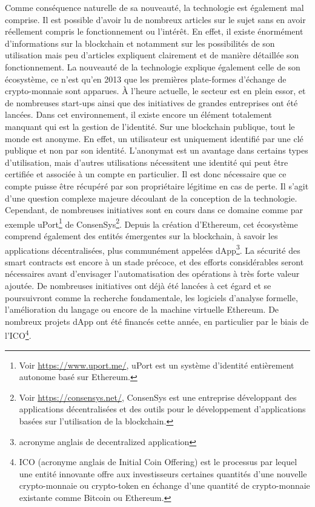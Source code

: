 \documentclass{tnreport}
\begin{document}
Comme conséquence naturelle de sa nouveauté, la technologie est également mal comprise.
Il est possible d'avoir lu de nombreux articles sur le sujet sans en avoir réellement compris le fonctionnement ou l'intérêt.
En effet, il existe énormément d'informations sur la blockchain et notamment sur les possibilités de son utilisation mais peu d'articles expliquent clairement et de manière détaillée son fonctionnement.
La nouveauté de la technologie explique également celle de son écosystème, ce n'est qu'en 2013 que les premières plate-formes d'échange de crypto-monnaie sont apparues.
À l'heure actuelle, le secteur est en plein essor, et de nombreuses start-ups ainsi que des initiatives de grandes entreprises ont été lancées.
Dans cet environnement, il existe encore un élément totalement manquant qui est la gestion de l'identité.
Sur une blockchain publique, tout le monde est anonyme. En effet, un utilisateur est uniquement identifié par une clé publique et non par son identité.
L'anonymat est un avantage dans certains types d'utilisation, mais d'autres utilisations nécessitent une identité qui peut être certifiée et associée à un compte en particulier. Il est donc nécessaire que ce compte puisse être récupéré par son propriétaire légitime en cas de perte.
Il s'agit d'une question complexe majeure découlant de la conception de la technologie. Cependant, de nombreuses initiatives sont en cours dans ce domaine comme par exemple uPort\footnote{Voir \url{https://www.uport.me/}, uPort est un système d'identité entièrement autonome basé sur Ethereum.} de ConsenSys\footnote{Voir \url{https://consensys.net/}, ConsenSys est une entreprise développant des applications décentralisées et des outils pour le développement d'applications basées sur l'utilisation de la blockchain.}.
Depuis la création d'Ethereum, cet écosystème comprend également des entités émergentes sur la blockchain, à savoir les applications décentralisées, plus communément appelées dApp\footnote{acronyme anglais de decentralized application}.
La sécurité des smart contracts est encore à un stade précoce, et des efforts considérables seront nécessaires avant d'envisager l'automatisation des opérations à très forte valeur ajoutée.
De nombreuses initiatives ont déjà été lancées à cet égard et se poursuivront comme la recherche fondamentale, les logiciels d'analyse formelle, l'amélioration du langage ou encore de la machine virtuelle Ethereum.
De nombreux projets dApp ont été financés cette année, en particulier par le biais de l'ICO\footnote{
ICO (acronyme anglais de Initial Coin Offering) est le processus par lequel une entité innovante offre aux investisseurs certaines quantités d'une nouvelle crypto-monnaie ou crypto-token en échange d'une quantité de crypto-monnaie existante comme Bitcoin ou Ethereum.}.
\end{document}
